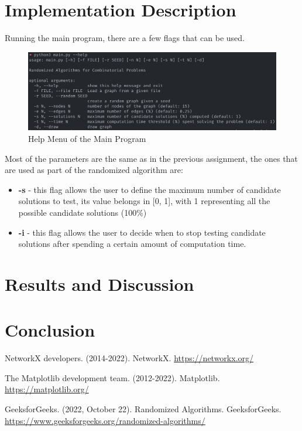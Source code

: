 \documentclass[...]{revdetua}
\begin{document}
\section{Implementation Description}

Running the main program, there are a few flags that
can be used.

\begin{figure}[!htb]
    \centering
    \includegraphics[width=1\columnwidth]{./figures/program_help}
    \caption{Help Menu of the Main Program}
    \label{fig: Help Menu}
\end{figure}

Most of the parameters are the same as in the previous assignment, the ones that are used as part of the randomized algorithm are:
\begin{itemize}
    \item \textbf{-s} - this flag allows the user to define the maximum number of candidate solutions to test, its value belongs in [0, 1], with 1 representing all the possible candidate solutions (100\%) 
    \item \textbf{-i} - this flag allows the user to decide  when  to  stop  testing candidate solutions after spending a certain amount of computation time.
\end{itemize}


\section{Results and Discussion}



\section{Conclusion}

\begin{thebibliography}{9}

NetworkX developers. (2014-2022). NetworkX. 
\url{https://networkx.org/}

The Matplotlib development team. (2012-2022). Matplotlib. \url{https://matplotlib.org/}

GeeksforGeeks. (2022, October 22). Randomized Algorithms. GeeksforGeeks. \url{https://www.geeksforgeeks.org/randomized-algorithms/}

\end{thebibliography}


\end{document}
